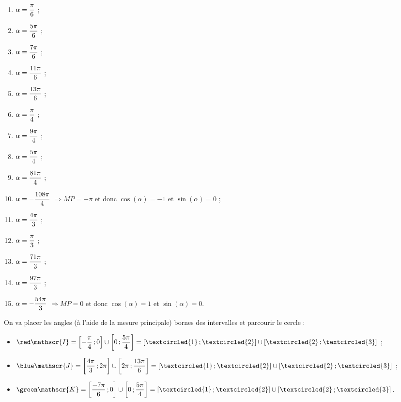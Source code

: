 \documentclass[a4paper,11pt]{article}
\begin{document}
\begin{enumerate}
	\item $\alpha=\vphantom{\angl{1}{2}}\angl{}{6}$  ;
	\item $\alpha=\dfrac{5\pi}{6}$  ;
	\item $\alpha=\dfrac{7\pi}{6}$  ;
	\item $\alpha=\dfrac{11\pi}{6}$  ;
	\item $\alpha=\dfrac{13\pi}{6}$  ;
	\item $\alpha=\vphantom{\angl{1}{2}}\angl{}{4}$  ;
	\item $\alpha=\dfrac{9\pi}{4}$  ;
	\item $\alpha=\dfrac{5\pi}{4}$  ;
	\item $\alpha=\dfrac{81\pi}{4}$  ;
	\item $\alpha=-\dfrac{108\pi}{4}$ \tabto{2cm}$\Rightarrow MP=-\pi$ \tabto{4.5cm}et donc $\cos(\alpha)=-1$ \tabto{8.5cm}et $\sin(\alpha)=0$ ;
	\item $\alpha=\dfrac{4\pi}{3}$  ;
	\item $\alpha=\vphantom{\angl{1}{2}}\angl{}{3}$  ;
	\item $\alpha=\dfrac{71\pi}{3}$  ;
	\item $\alpha=\dfrac{97\pi}{3}$  ;
	\item $\alpha=-\dfrac{54\pi}{3}$ \tabto{2cm}$\Rightarrow MP=0$ \tabto{4.5cm}et donc $\cos(\alpha)=1$ \tabto{8.5cm}et $\sin(\alpha)=0$.
\end{enumerate}

\medskip


\medskip

On va placer les angles (à l'aide de la mesure principale) \og bornes \fg{} des intervalles et parcourir le cercle :

\begin{itemize}
	\item $\red \mathscr{I}=\intervFF{-\dfrac{\pi}{4}}{0} \cup \intervFF{0}{\dfrac{5\pi}{4}} = \intervFF{\textcircled{1}}{\textcircled{2}} \cup \intervFF{\textcircled{2}}{\textcircled{3}}$ ;
	\item $\blue \mathscr{J}=\intervFF{\dfrac{4\pi}{3}}{2\pi} \cup \intervFF{2\pi}{\dfrac{13\pi}{6}} = \intervFF{\textcircled{1}}{\textcircled{2}} \cup \intervFF{\textcircled{2}}{\textcircled{3}}$ ;
	\item $\green \mathscr{K}=\intervFF{\dfrac{-7\pi}{6}}{0} \cup \intervFF{0}{\dfrac{5\pi}{4}} = \intervFF{\textcircled{1}}{\textcircled{2}} \cup \intervFF{\textcircled{2}}{\textcircled{3}}$.
\end{itemize}
\end{document}
